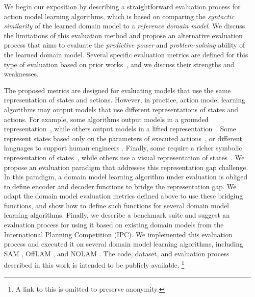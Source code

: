 \documentclass{article}
\theoremstyle{definition}
\theoremstyle{remark}
\newif\ifaddcomments
\newcommand{\roni}[1]{\ifaddcomments{\textcolor{red}{[Roni: #1]}}\fi}
\begin{document}
We begin our exposition by describing a straightforward evaluation process for action model learning algorithms, which is based on comparing the \emph{syntactic similarity} of the learned domain model to a \emph{reference domain model}. We discuss the limitations of this evaluation method and propose an alternative evaluation process that aims to evaluate the \emph{predictive power} and \emph{problem-solving} ability of the learned domain model. 
Several specific evaluation metrics are defined for this type of evaluation based on prior works~\citep{aineto2019learning,juba2021safe,mordoch2024safe,Oswald2024DLLMDomainModeling}, and we discuss their strengths and weaknesses. 


The proposed metrics are designed for evaluating models that use the same representation of states and actions. 
However, in practice, action model learning algorithms may output models that use different representations of states and actions. 
For example, some algorithms output models in a grounded representation~\citep{stern2017efficient}, while others output models in a lifted representation~\citep{juba2021safe,xi2024neuro,LAMANNA2025104256}. 
Some represent states based only on the parameters of executed actions~\citep{cresswell2011generalised}, or different languages to support human engineers \citep{mccluskey2010action}. 
Finally, some require a richer symbolic representation of states~\citep{juba2021safe, Lamanna24}, while others use a visual representation of states~\citep{asai2022classical, xi2024neuro}.
We propose an evaluation paradigm that addresses this representation gap challenge. 
In this paradigm, a domain model learning algorithm under evaluation is obliged to define encoder and decoder functions to bridge the representation gap. 
We adapt the domain model evaluation metrics defined above to use these bridging functions, 
and show how to define such functions for several domain model learning algorithms. 
Finally, we describe a benchmark suite and suggest an evaluation process for using it based on existing domain models from the International Planning Competition (IPC). 
We implemented this evaluation process and executed it on several domain model learning algorithms, including SAM \citep{juba2021safe}, OffLAM \citep{LAMANNA2025104256}, and NOLAM \citep{Lamanna24}. 
The code, dataset, and evaluation process described in this work is intended to be publicly available.
\footnote{A link to this is omitted to preserve anonymity.} 
\end{document}
